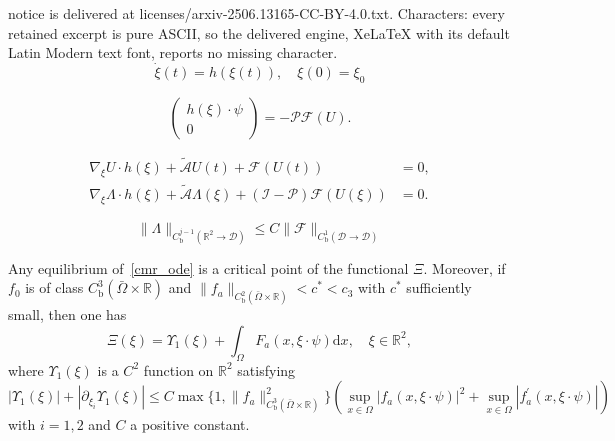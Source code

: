 \documentclass[10pt,a4paper]{amsart}
\begin{document}
notice is delivered at licenses/arxiv-2506.13165-CC-BY-4.0.txt. Characters: every retained excerpt is pure ASCII, so the delivered engine, XeLaTeX with its default Latin Modern text font, reports no missing character.
\begin{equation} \label{cmr_ode}
\dot{\xi}(t) = h(\xi(t)), \quad \xi(0) = \xi_0
\end{equation}

\begin{equation} \label{cmr_ode1}
\left(
\begin{array}{c}
h(\xi)\cdot\psi \\
0
\end{array}
\right)
=
-\mathcal{P}\mathcal{F}(U).
\end{equation}

\begin{equation}\label{cmr_ode2}
\begin{split}
	\nabla_{\xi} U \cdot h(\xi) + \tilde{\mathcal{A}}U(t) + \mathcal{F}(U(t)) &= 0,\\
	\nabla_{\xi} \Lambda \cdot h(\xi) + \tilde{\mathcal{A}}\Lambda(\xi) + (\mathcal{I}-\mathcal{P})\mathcal{F}(U(\xi)) &= 0.
\end{split}
\end{equation}

\begin{equation}\label{cmr_estimate}
	\|\Lambda\|_{C^{j-1}_{\mathrm{b}}(\mathbb{R}^2\rightarrow \mathcal{D})} \leqslant C\|\mathcal{F}\|_{C^{1}_{\mathrm{b}}(\mathcal{D}\rightarrow \mathcal{D})}
\end{equation}

\begin{lemma}\label{decomposition_1}
Any equilibrium of~\eqref{cmr_ode} is a critical point of the functional $\Xi$. Moreover, if $f_0$ is of class $ C^3_{\mathrm{b}}(\bar{\Omega}\times\mathbb{R})$ and $\|f_a\|_{C^2_{\mathrm{b}}(\bar{\Omega}\times\mathbb{R})}< c^{\ast} < c_3$ with $c^{\ast}$ sufficiently small, then one has
\[
	\Xi(\xi) = \Upsilon_1(\xi) +  \int_{\Omega}F_a(x, \xi\cdot\psi)\mathrm{d}x, \quad \xi\in\mathbb{R}^2,
\]
where $\Upsilon_1(\xi)$ is a $C^2$ function on $\mathbb{R}^2$ satisfying
\begin{equation} \label{estimates_lyapunov_3}
|\Upsilon_1(\xi)| + |\partial_{\xi_i}\Upsilon_1(\xi)|\leqslant C\max\{1, \|f_a\|^2_{C^3_{\mathrm{b}}(\bar{\Omega}\times\mathbb{R})}\}\left( \sup_{x\in\Omega}|f_a(x, \xi\cdot\psi)|^2 + \sup_{x\in\Omega}|f^{\prime}_a(x, \xi\cdot\psi)| \right)
\end{equation}
with $i=1, 2$ and $C$ a positive constant.
\end{lemma}
\end{document}
